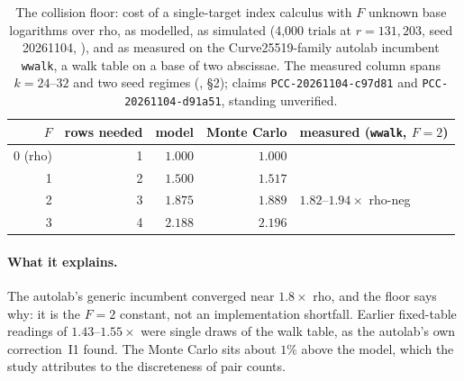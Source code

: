 \begin{table}[t]
\centering\small
\begin{tabular}{@{}rrrrl@{}}
\toprule
$F$ & rows needed & model & Monte Carlo & measured (\texttt{wwalk}, $F=2$) \\
\midrule
0 (rho) & 1 & $1.000$ & $1.000$ & \\
1 & 2 & $1.500$ & $1.517$ & \\
2 & 3 & $1.875$ & $1.889$ & $1.82$--$1.94\times$ rho-neg \\
3 & 4 & $2.188$ & $2.196$ & \\
\bottomrule
\end{tabular}
\caption[]{The collision floor: cost of a single-target index calculus with
$F$ unknown base logarithms over rho, as modelled, as simulated (4{,}000
trials at $r=131{,}203$, seed 20261104, ),
and as measured on the Curve25519-family autolab incumbent \texttt{wwalk},
a walk table on a base of two abscissae. The measured column spans
$k=24$--$32$ and two seed regimes
(, \S2);
claims \texttt{PCC-20261104-c97d81} and \texttt{PCC-20261104-d91a51},
standing unverified.}
\label{tab:gf-collision}
\end{table}

\paragraph{What it explains.} The autolab's generic incumbent converged
near $1.8\times$ rho, and the floor says why: it is the $F=2$ constant,
not an implementation shortfall. Earlier fixed-table readings of
$1.43$--$1.55\times$ were single draws of the walk table, as the autolab's
own correction~I1 found. The Monte Carlo sits about $1\%$ above the model,
which the study attributes to the discreteness of pair counts.

